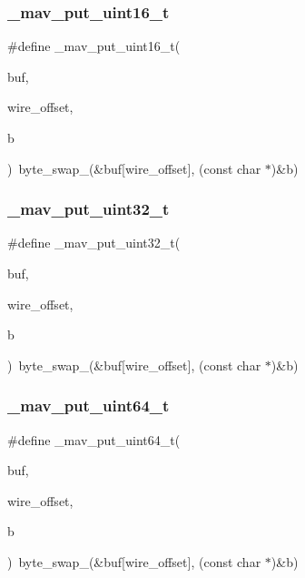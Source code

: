 \mbox{\label{protocol_8h_a42a5eee59a41e8a52051491d7cf65ca9}} 
\subsubsection{\+\_\+mav\+\_\+put\+\_\+uint16\+\_\+t}
{\footnotesize\ttfamily \#define \+\_\+mav\+\_\+put\+\_\+uint16\+\_\+t(\begin{DoxyParamCaption}\item[{}]{buf,  }\item[{}]{wire\+\_\+offset,  }\item[{}]{b }\end{DoxyParamCaption})~byte\+\_\+swap\+\_(\&buf[wire\+\_\+offset], (const char $\ast$)\&b)}

\mbox{\label{protocol_8h_ad4eb6d38fefd862941176a9072c1c1c5}} 
\subsubsection{\+\_\+mav\+\_\+put\+\_\+uint32\+\_\+t}
{\footnotesize\ttfamily \#define \+\_\+mav\+\_\+put\+\_\+uint32\+\_\+t(\begin{DoxyParamCaption}\item[{}]{buf,  }\item[{}]{wire\+\_\+offset,  }\item[{}]{b }\end{DoxyParamCaption})~byte\+\_\+swap\+\_(\&buf[wire\+\_\+offset], (const char $\ast$)\&b)}

\mbox{\label{protocol_8h_a9efbc3b5ebcb74878f26fbef0939b013}} 
\subsubsection{\+\_\+mav\+\_\+put\+\_\+uint64\+\_\+t}
{\footnotesize\ttfamily \#define \+\_\+mav\+\_\+put\+\_\+uint64\+\_\+t(\begin{DoxyParamCaption}\item[{}]{buf,  }\item[{}]{wire\+\_\+offset,  }\item[{}]{b }\end{DoxyParamCaption})~byte\+\_\+swap\+\_(\&buf[wire\+\_\+offset], (const char $\ast$)\&b)}

